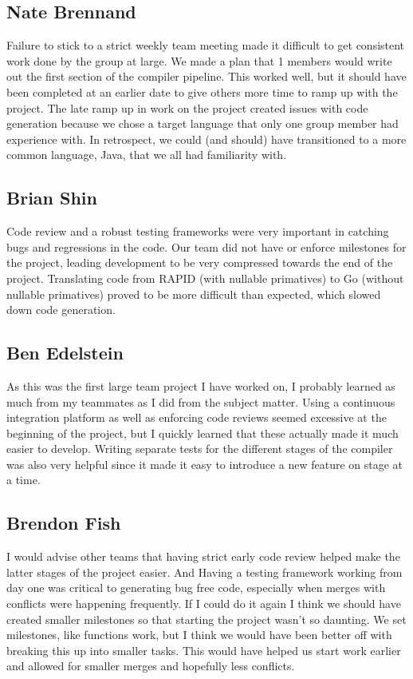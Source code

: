 
\subsection*{Nate Brennand}

Failure to stick to a strict weekly team meeting made it difficult to get consistent work done by the group at large.
We made a plan that 1  members would write out the first section of the compiler pipeline.
This worked well, but it should have been completed at an earlier date to give others more time to ramp up with the project.
The late ramp up in work on the project created issues with code generation because we chose a target language that only one group member had experience with.
In retrospect, we could (and should) have transitioned to a more common language, Java, that we all had familiarity with.

\subsection*{Brian Shin}

Code review and a robust testing frameworks were very important in catching bugs and regressions in the code.
Our team did not have or enforce milestones for the project, leading development to be very compressed towards the end of the project.
Translating code from RAPID (with nullable primatives) to Go (without nullable primatives) proved to be more difficult than expected, which slowed down code generation.


\subsection*{Ben Edelstein}

As this was the first large team project I have worked on, I probably learned as much from my teammates as I did from the subject matter. Using a continuous integration platform as well as enforcing code reviews seemed excessive at the beginning of the project, but I quickly learned that these actually made it much easier to develop. Writing separate tests for the different stages of the compiler was also very helpful since it made it easy to introduce a new feature on stage at a time.

\subsection*{Brendon Fish}

I would advise other teams that having strict early code review helped make the latter stages of the project easier.  And Having a testing framework working from day one was critical to generating bug free code, especially when merges with conflicts were happening frequently.  
If I could do it again I think we should have created smaller milestones so that starting the project wasn't so daunting.  We set milestones, like functions work, but I think we would have been better off with breaking this up into smaller tasks.  This would have helped us start work earlier and allowed for smaller merges and hopefully less conflicts.   